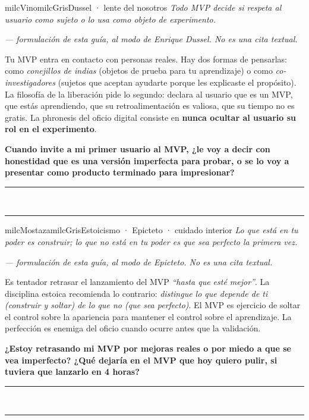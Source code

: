 \documentclass[11pt,letterpaper]{article}
\newcommand{\linead}[1]{\noindent\color{milcLinea}\rule{#1}{0.5pt}\color{milcNegro}}
\begin{document}
\begin{softbox}{milcVino}{milcGris}{Dussel · lente del nosotros}
\textit{Todo MVP decide si respeta al usuario como sujeto o lo usa como objeto de experimento.}

{\footnotesize\itshape\color{milcNegro!70}--- formulación de esta guía, al modo de Enrique Dussel. No es una cita textual.}

Tu MVP entra en contacto con personas reales. Hay dos formas de pensarlas: como \emph{conejillos de indias} (objetos de prueba para tu aprendizaje) o como \emph{co-investigadores} (sujetos que aceptan ayudarte porque les explicaste el propósito). La filosofía de la liberación pide lo segundo: declara al usuario que es un MVP, que estás aprendiendo, que su retroalimentación es valiosa, que su tiempo no es gratis. La phronesis del oficio digital consiste en \textbf{nunca ocultar al usuario su rol en el experimento}.

\textbf{Cuando invite a mi primer usuario al MVP, ¿le voy a decir con honestidad que es una versión imperfecta para probar, o se lo voy a presentar como producto terminado para impresionar?}
\end{softbox}
\linead{\linewidth}\\[1mm]
\linead{\linewidth}

\begin{softbox}{milcMostaza}{milcGris}{Estoicismo · Epicteto · cuidado interior}
\textit{Lo que está en tu poder es construir; lo que no está en tu poder es que sea perfecto la primera vez.}

{\footnotesize\itshape\color{milcNegro!70}--- formulación de esta guía, al modo de Epicteto. No es una cita textual.}

Es tentador retrasar el lanzamiento del MVP \emph{``hasta que esté mejor''}. La disciplina estoica recomienda lo contrario: \emph{distingue lo que depende de ti (construir y soltar) de lo que no (que sea perfecto)}. El MVP es ejercicio de soltar el control sobre la apariencia para mantener el control sobre el aprendizaje. La perfección es enemiga del oficio cuando ocurre antes que la validación.

\textbf{¿Estoy retrasando mi MVP por mejoras reales o por miedo a que se vea imperfecto? ¿Qué dejaría en el MVP que hoy quiero pulir, si tuviera que lanzarlo en 4 horas?}
\end{softbox}
\linead{\linewidth}\\[1mm]
\linead{\linewidth}
\end{document}
